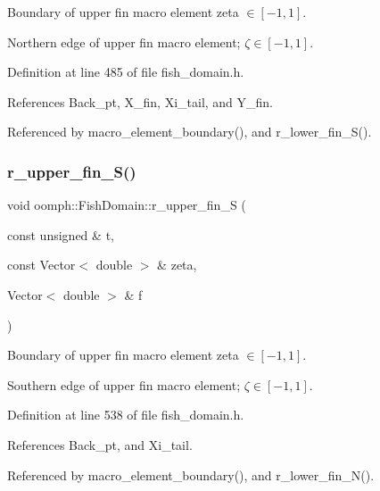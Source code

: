 Boundary of upper fin macro element zeta $ \in [-1,1] $. 

Northern edge of upper fin macro element; $ \zeta \in [-1,1] $. 

Definition at line 485 of file fish\+\_\+domain.\+h.



References Back\+\_\+pt, X\+\_\+fin, Xi\+\_\+tail, and Y\+\_\+fin.



Referenced by macro\+\_\+element\+\_\+boundary(), and r\+\_\+lower\+\_\+fin\+\_\+\+S().

\mbox{\label{classoomph_1_1FishDomain_acd62f651648d85a79e04ced3193c3a2a}} 
\subsubsection{\texorpdfstring{r\+\_\+upper\+\_\+fin\+\_\+\+S()}{r\_upper\_fin\_S()}}
{\footnotesize\ttfamily void oomph\+::\+Fish\+Domain\+::r\+\_\+upper\+\_\+fin\+\_\+S (\begin{DoxyParamCaption}\item[{const unsigned \&}]{t,  }\item[{const Vector$<$ double $>$ \&}]{zeta,  }\item[{Vector$<$ double $>$ \&}]{f }\end{DoxyParamCaption})\hspace{0.3cm}{\ttfamily [private]}}



Boundary of upper fin macro element zeta $ \in [-1,1] $. 

Southern edge of upper fin macro element; $ \zeta \in [-1,1] $. 

Definition at line 538 of file fish\+\_\+domain.\+h.



References Back\+\_\+pt, and Xi\+\_\+tail.



Referenced by macro\+\_\+element\+\_\+boundary(), and r\+\_\+lower\+\_\+fin\+\_\+\+N().

\mbox{\label{classoomph_1_1FishDomain_a750c0daa893d08038a52fbf20a4b23b8}} 
